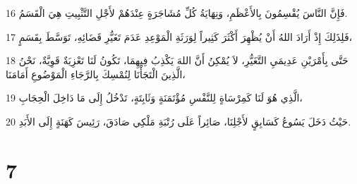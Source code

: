 \par 16 فَإِنَّ النَّاسَ يُقْسِمُونَ بِالأَعْظَمِ، وَنِهَايَةُ كُلِّ مُشَاجَرَةٍ عِنْدَهُمْ لأَجْلِ التَّثْبِيتِ هِيَ الْقَسَمُ.
\par 17 فَلِذَلِكَ إِذْ أَرَادَ اللهُ أَنْ يُظْهِرَ أَكْثَرَ كَثِيراً لِوَرَثَةِ الْمَوْعِدِ عَدَمَ تَغَيُّرِ قَضَائِهِ، تَوَسَّطَ بِقَسَمٍ،
\par 18 حَتَّى بِأَمْرَيْنِ عَدِيمَيِ التَّغَيُّرِ، لاَ يُمْكِنُ أَنَّ اللهَ يَكْذِبُ فِيهِمَا، تَكُونُ لَنَا تَعْزِيَةٌ قَوِيَّةٌ، نَحْنُ الَّذِينَ الْتَجَأْنَا لِنُمْسِكَ بِالرَّجَاءِ الْمَوْضُوعِ أَمَامَنَا،
\par 19 الَّذِي هُوَ لَنَا كَمِرْسَاةٍ لِلنَّفْسِ مُؤْتَمَنَةٍ وَثَابِتَةٍ، تَدْخُلُ إِلَى مَا دَاخِلَ الْحِجَابِ،
\par 20 حَيْثُ دَخَلَ يَسُوعُ كَسَابِقٍ لأَجْلِنَا، صَائِراً عَلَى رُتْبَةِ مَلْكِي صَادَقَ، رَئِيسَ كَهَنَةٍ إِلَى الأَبَدِ.

\chapter{7}

